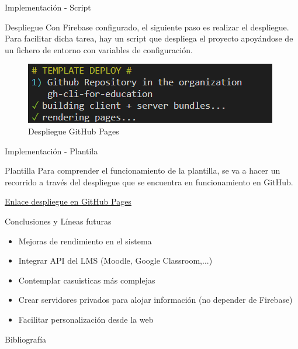 \documentclass{beamer}
\begin{document}
    \begin{frame}{Implementación - Script}
    
        \begin{block}{Despliegue}
            Con Firebase configurado, el siguiente paso es realizar el despliegue. Para facilitar dicha tarea, hay un script que despliega el proyecto apoyándose de un fichero de entorno con variables de configuración. 
        \end{block}

        \begin{center}  
            \begin{figure}
                \includegraphics[width=.7\textwidth]{Presentacion/implementacion/script/deploy.png}
                \caption{Despliegue GitHub Pages}
            \end{figure}            
        \end{center}
        
        
    \end{frame}  

    \begin{frame}{Implementación - Plantila}
    
        \begin{block}{Plantilla}
            Para comprender el funcionamiento de la plantilla, se va a hacer un recorrido a través del despliegue que se encuentra en funcionamiento en GitHub.
        \end{block}        

        \href{https://gh-cli-for-education.github.io/gh-education/}{Enlace despliegue en GitHub Pages}
        
    \end{frame}

    \begin{frame}{Conclusiones y Líneas futuras}
        \begin{itemize}
            \item Mejoras de rendimiento en el sistema
            \item Integrar API del LMS (Moodle, Google Classroom,...)
            \item Contemplar casuisticas más complejas
            \item Crear servidores privados para alojar información (no depender de Firebase)
            \item Facilitar personalización desde la web
        \end{itemize}
    \end{frame}  

    \begin{frame}{Bibliografía}

        
        
        \nocite{*}
        
    \end{frame}  
\end{document}
